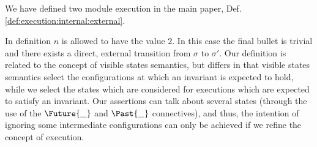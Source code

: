 We have defined two module execution in the main paper, Def. \ref{def:execution:internal:external}.
%
%
%
%

In  definition %
$n$ is allowed to have the value $2$. In this case the final bullet is trivial and  there exists a direct, external transition from $\sigma$ to $\sigma'$.  Our definition is related to the concept of visible states semantics, but differs in that visible states semantics select the configurations at which an invariant is expected to hold, while we select the states which are considered for executions which are expected to satisfy an invariant. Our assertions can talk about several states (through the use of the $\Future {\_}$ and $\Past{\_}$ connectives), and thus, the intention of ignoring some intermediate configurations can only be achieved if we refine the concept of execution. 

